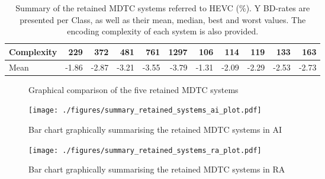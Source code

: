 \documentclass[11pt,a4paper,openright,twoside]{book}
\def\usepdfs{1} %
\numberwithin{equation}{section} %
\numberwithin{figure}{section} %
\numberwithin{table}{section} %
\begin{document}
\begin{table}[tb]
\begin{tabularx}{0.95\linewidth}{X|r|rrrr||r|rrrr}
		\hline
        Complexity &   229 &   372 &   481 &   761 &  1297 &   106 &  114  &   119 &   133 &   163 \\
		\hline
        Mean       & -1.86 & -2.87 & -3.21 & -3.55 & -3.79 & -1.31 & -2.09 & -2.29 & -2.53 & -2.73 \\
	\end{tabularx}
	\caption[Summary of the retained \acs{MDTC} systems referred to \ac{HEVC}]
	{Summary of the retained \acs{MDTC} systems referred to \ac{HEVC} (\%).
	Y \acs{BD}-rates are presented per Class, as well as their mean, median, best and worst values.
	The encoding complexity of each system is also provided.}
	\label{tab:summary_final_systems}
\end{table}

\begin{figure}[tb]
	\def\scale{0.40}
	\def\encmax{1300}
	\def\decmax{110}
	\def\bdrmax{-4}
	\def\rommax{128}
	\centering

	\def\bdr{-1.86}
	\def\enc{229}
	\def\dec{100}
	\def\rom{3.97}
	\def\bdr{-2.87}
	\def\enc{372}
	\def\dec{105}
	\def\rom{15.84}

	\def\bdr{-3.21}
	\def\enc{481}
	\def\dec{105}
	\def\rom{31.92}
	\def\bdr{-3.55}
	\def\enc{761}
	\def\dec{105}
	\def\rom{63.84}

	\def\bdr{-3.79}
	\def\enc{1297}
	\def\dec{105}
	\def\rom{123.38}

	\caption{Graphical comparison of the five retained \acs{MDTC} systems}
	\label{fig:four_way_mdtc_comparison}
\end{figure}
\begin{figure}[tb]
	\centering
	\ifthenelse{\usepdfs = 0}
	{}
	{\texttt{[image: ./figures/summary\_retained\_systems\_ai\_plot.pdf]}}
	\caption{Bar chart graphically summarising the retained \acs{MDTC} systems
	in \acs{AI}}
	\label{fig:final_systems_ai}
\end{figure}
\begin{figure}[tb]
	\centering
	\ifthenelse{\usepdfs = 0}
	{}
	{\texttt{[image: ./figures/summary\_retained\_systems\_ra\_plot.pdf]}}
	\caption{Bar chart graphically summarising the retained \acs{MDTC} systems
	in \acs{RA}}
	\label{fig:final_systems_ra}
\end{figure}
\end{document}
